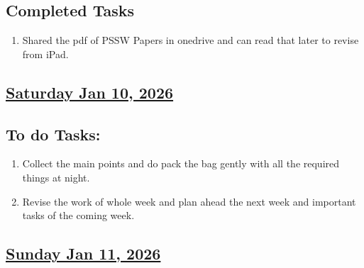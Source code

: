 \subsection*{Completed Tasks}
\begin{enumerate}[\ding{52}]  %
    \item Shared the pdf of PSSW Papers in onedrive and can read that later to revise from iPad. 
\end{enumerate}
\subsection*{\underline{Saturday Jan 10, 2026} }
\subsection*{To do Tasks:}
\begin{enumerate}
    \item Collect the main points and do pack the bag gently with all the required things at night.
    \item Revise the work of whole week and plan ahead the next week and important tasks of the coming week. 
\end{enumerate}
\subsection*{\underline{Sunday Jan 11, 2026}}
